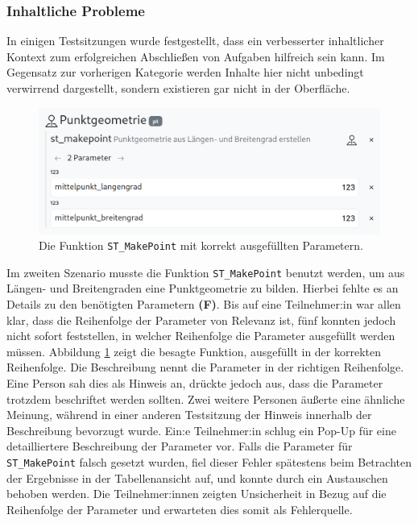\subsubsection{Inhaltliche Probleme}
In einigen Testsitzungen wurde festgestellt, dass ein verbesserter inhaltlicher Kontext zum erfolgreichen Abschließen von Aufgaben hilfreich sein kann. Im Gegensatz zur vorherigen Kategorie werden Inhalte hier nicht unbedingt verwirrend dargestellt, sondern existieren gar nicht in der Oberfläche.

\begin{figure}[!ht]
  \centering
  \includegraphics[width=.9\textwidth]{assets/st-makepoint.png}
  \caption{Die Funktion \texttt{ST\_MakePoint} mit korrekt ausgefüllten Parametern.}
  \label{fig:parameters}
\end{figure}
Im zweiten Szenario musste die Funktion \texttt{ST\_MakePoint} benutzt werden, um aus Längen- und Breitengraden eine Punktgeometrie zu bilden. Hierbei fehlte es an Details zu den benötigten Parametern \textbf{(F)}. Bis auf eine Teilnehmer:in war allen klar, dass die Reihenfolge der Parameter von Relevanz ist, fünf konnten jedoch nicht sofort feststellen, in welcher Reihenfolge die Parameter ausgefüllt werden müssen. Abbildung \ref{fig:parameters} zeigt die besagte Funktion, ausgefüllt in der korrekten Reihenfolge. Die Beschreibung nennt die Parameter in der richtigen Reihenfolge. Eine Person sah dies als Hinweis an, drückte jedoch aus, dass die Parameter trotzdem beschriftet werden sollten. Zwei weitere Personen äußerte eine ähnliche Meinung, während in einer anderen Testsitzung der Hinweis innerhalb der Beschreibung bevorzugt wurde. Ein:e Teilnehmer:in schlug ein Pop-Up für eine detailliertere Beschreibung der Parameter vor. Falls die Parameter für \texttt{ST\_MakePoint} falsch gesetzt wurden, fiel dieser Fehler spätestens beim Betrachten der Ergebnisse in der Tabellenansicht auf, und konnte durch ein Austauschen behoben werden. Die Teilnehmer:innen zeigten Unsicherheit in Bezug auf die Reihenfolge der Parameter und erwarteten dies somit als Fehlerquelle.

